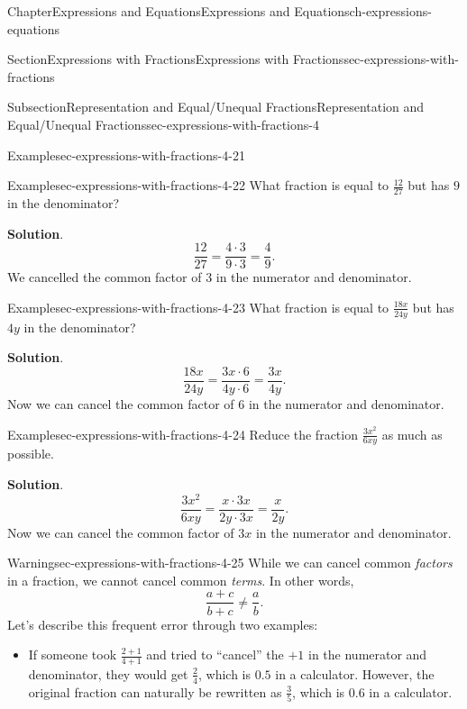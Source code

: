 \documentclass[twoside,11pt,]{book}
\newcommand{\blocktitlefont}{\relax}
\numberwithin{equation}{chapter}
\begin{document}
\begin{chapterptx}{Chapter}{Expressions and Equations}{}{Expressions and Equations}{}{}{ch-expressions-equations}
\begin{sectionptx}{Section}{Expressions with Fractions}{}{Expressions with Fractions}{}{}{sec-expressions-with-fractions}
\begin{subsectionptx}{Subsection}{Representation and Equal\slash{}Unequal Fractions}{}{Representation and Equal\slash{}Unequal Fractions}{}{}{sec-expressions-with-fractions-4}
\begin{example}{Example}{}{sec-expressions-with-fractions-4-21}
\end{example}
\begin{example}{Example}{}{sec-expressions-with-fractions-4-22}%
What fraction is equal to \(\frac{12}{27}\) but has \(9\) in the denominator?%
\par\smallskip%
\noindent\textbf{\blocktitlefont Solution}.\hypertarget{sec-expressions-with-fractions-4-22-2}{}\quad{}%
\begin{equation*}
\frac{12}{27}=\frac{4 \cdot 3}{9 \cdot 3}=\frac{4}{9}.
\end{equation*}
We cancelled the common factor of \(3\) in the numerator and denominator.%
\end{example}
\begin{example}{Example}{}{sec-expressions-with-fractions-4-23}%
What fraction is equal to \(\frac{18x}{24y}\) but has \(4y\) in the denominator?%
\par\smallskip%
\noindent\textbf{\blocktitlefont Solution}.\hypertarget{sec-expressions-with-fractions-4-23-2}{}\quad{}%
\begin{equation*}
\frac{18x}{24y}=\frac{3x \cdot 6}{4y \cdot 6}=\frac{3x}{4y}.
\end{equation*}
Now we can cancel the common factor of \(6\) in the numerator and denominator.%
\end{example}
\begin{example}{Example}{}{sec-expressions-with-fractions-4-24}%
Reduce the fraction \(\frac{3x^2}{6xy}\) as much as possible.%
\par\smallskip%
\noindent\textbf{\blocktitlefont Solution}.\hypertarget{sec-expressions-with-fractions-4-24-2}{}\quad{}%
\begin{equation*}
\frac{3x^2}{6xy}=\frac{x \cdot 3x}{2y \cdot 3x}=\frac{x}{2y}.
\end{equation*}
Now we can cancel the common factor of \(3x\) in the numerator and denominator.%
\end{example}
\begin{warning}{Warning}{}{sec-expressions-with-fractions-4-25}%
While we can cancel common \emph{factors} in a fraction, we cannot cancel common \emph{terms}. In other words,%
\begin{equation*}
\frac{a + c}{b + c} \not= \frac{a}{b}.
\end{equation*}
Let's describe this frequent error through two examples:%
\begin{itemize}[label=\textbullet]
\item{}If someone took \(\frac{2+1}{4+1}\) and tried to ``cancel'' the \(+1\) in the numerator and denominator, they would get \(\frac{2}{4}\), which is \(0.5\) in a calculator. However, the original fraction can naturally be rewritten as \(\frac{3}{5}\), which is \(0.6\) in a calculator.%

\end{itemize}
\end{warning}
\end{subsectionptx}
\end{sectionptx}
\end{chapterptx}
\end{document}
